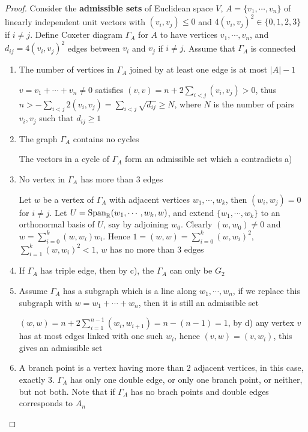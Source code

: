 \documentclass[main]{subfiles}
\begin{document}
\begin{proof}
Consider the \textbf{admissible sets} of Euclidean space $V$, $A=\{v_1,\cdots,v_n\}$ of linearly independent unit vectors with $(v_i,v_j)\leq0$ and $4(v_i,v_j)^2\in \{0,1,2,3\}$ if $i\neq j$. Define Coxeter diagram $\Gamma_A$ for $A$  to have vertices $v_1,\cdots,v_n$, and $d_{ij}= 4(v_i,v_j)^2$ edges between $v_i$ and $v_j$ if $i\neq j$. Assume that $\Gamma_A$ is connected \par
\begin{enumerate}[leftmargin=*,label=\textbf{\alph*)}]
\item The number of vertices in $\Gamma_A$ joined by at least one edge is at most $|A|-1$ \par
$v=v_1+\cdots+v_n\neq 0$ satisfies $(v,v) =n+ 2\displaystyle\sum_{i<j}(v_i,v_j)>0$, thus $n >-\displaystyle\sum_{i<j}2(v_i,v_j) =\sum_{i<j}\sqrt{d_{ij}}\geq N$, where $N$ is the number of pairs $v_i,v_j$ such that $d_{ij}\geq 1$
\item The graph $\Gamma_A$ contains no cycles \par
The vectors in a cycle of $\Gamma_A$ form an admissible set which a contradicts a)
\item No vertex in $\Gamma_A$ has more than $3$ edges \par
Let $w$ be a vertex of $\Gamma_A$ with adjacent vertices $w_1,\cdots,w_k$, then $(w_i,w_j) = 0$ for $i\neq j$.  Let $U= \operatorname{Span}_{\mathbb R}(w_1,\cdots,w_k,w)$, and extend $\{w_1,\cdots,w_k\}$ to an orthonormal basis of $U$, say by adjoining $w_0$. Clearly $(w,w_0)\neq 0$ and $w=\displaystyle\sum^k_{i=0}(w,w_i)w_i$. Hence $1 = (w,w)= \displaystyle\sum^k_{i=0}(w,w_i)^2$, $\displaystyle\sum^k_{i=1}(w,w_i)^2<1$, $w$ has no more than $3$ edges
\item If $\Gamma_A$ has triple edge, then by c), the $\Gamma _A$ can only be $G_2$
\item Assume $\Gamma_A$ has a subgraph which is a line along $w_1,\cdots,w_n$, if we replace this subgraph with $w=w_1+\cdots+w_n$, then it is still an admissible set \par
$(w,w)=n+\displaystyle2\sum_{i=1}^{n-1}(w_i,w_{i+1})=n-(n-1)=1$, by d) any vertex $v$ has at most edges linked with one such $w_i$, hence $(v,w)=(v,w_i)$, this gives an admissible set
\item A branch point is a vertex having more than $2$ adjacent vertices, in this case, exactly $3$. $\Gamma_A$ has only one double edge, or only one branch point, or neither, but not both. Note that if $\Gamma_A$ has no brach points and double edges corresponds to $A_n$ \par

\end{enumerate}
\end{proof}
\end{document}
